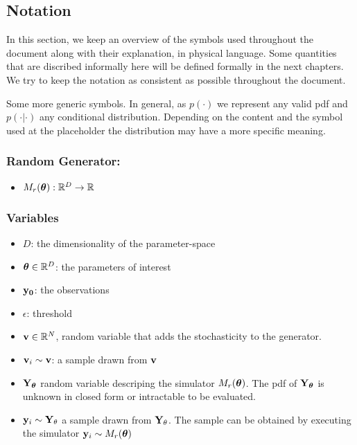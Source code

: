 \subsection{Notation}
\label{subsec:notation}

In this section, we keep an overview of the symbols used throughout
the document along with their explanation, in physical language. Some
quantities that are discribed informally here will be defined formally
in the next chapters. We try to keep the notation as consistent as
possible throughout the document.

 Some more generic symbols. In general, as $p(\cdot)$ we represent any valid pdf and $p(\cdot | \cdot)$ any conditional distribution. Depending on the content and the symbol used at the placeholder the distribution may have a more specific meaning.


\subsubsection*{Random Generator:}
\label{sec:random-generator}
\begin{itemize}
\item $M_r(\boldsymbol{\theta}): \mathbb{R}^D \rightarrow \mathbb{R}$
\end{itemize}

\subsubsection*{Variables}
\label{sec:variables}

\begin{itemize}
\item $D$: the dimensionality of the parameter-space
\item $\boldsymbol{\theta} \in \mathbb{R}^D$: the parameters of interest
\item $\mathbf{y_0}$: the observations
\item $\epsilon$: threshold
\item $\mathbf{v} \in \mathbb{R}^N$, random variable that adds the stochasticity to the generator. 
\item $\mathbf{v}_i \sim \mathbf{v}$: a sample drawn from $\mathbf{v}$
\item $\mathbf{Y}_{\boldsymbol{\theta}}$ random variable descriping the simulator $M_r(\boldsymbol{\theta})$. The pdf of $\mathbf{Y}_{\boldsymbol{\theta}}$ is unknown in closed form or intractable to be evaluated.
\item $\mathbf{y}_i \sim \mathbf{Y}_\theta$ a sample drawn from $\mathbf{Y}_\theta$. The sample can be obtained by executing the simulator $\mathbf{y}_i \sim M_r(\boldsymbol{\theta})$
\end{itemize}


